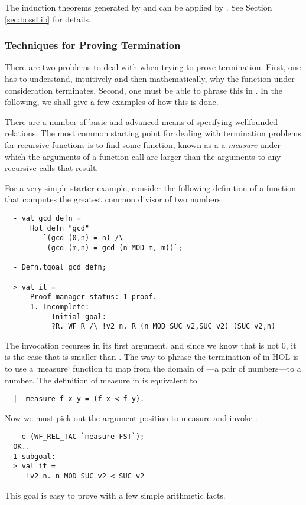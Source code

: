 The induction theorems generated by  and  can 
be applied by . See Section \ref{sec:bossLib} for details.

\subsubsection{Techniques for Proving Termination}

There are two problems to deal with when trying to prove termination.
First, one has to understand, intuitively and then mathematically,
why the function under consideration terminates. Second, one must
be able to phrase this in \HOL. In the following, we shall give a few
examples of how this is done.

There are a number of basic and advanced means of specifying wellfounded
relations. The most common starting point for dealing with termination
problems for recursive functions is to find some function, known as a a
\emph{measure} under which the arguments of a function call are larger
than the arguments to any recursive calls that result.

For a very simple starter example, consider the following definition
of a function that computes the greatest common divisor of two
numbers:
%
\setcounter{sessioncount}{0}
\begin{session}
\begin{hol}
\begin{verbatim}
  - val gcd_defn =
      Hol_defn "gcd"
         `(gcd (0,n) = n) /\
          (gcd (m,n) = gcd (n MOD m, m))`;

  - Defn.tgoal gcd_defn;

  > val it =
      Proof manager status: 1 proof.
      1. Incomplete:
           Initial goal:
           ?R. WF R /\ !v2 n. R (n MOD SUC v2,SUC v2) (SUC v2,n)
\end{verbatim}
\end{hol}
\end{session}
%
The invocation  recurses in its first argument, and
since we know that  is not 0, it is the case that
 is smaller than \holtxt{m}. The way to phrase the
termination of  in HOL is to use a `measure` function
to map from the domain of \holtxt{gcd}---a pair of numbers---to a number.
The definition of {measure} in \HOL{} is equivalent to
%
\begin{hol}
\begin{verbatim}
  |- measure f x y = (f x < f y).
\end{verbatim}
\end{hol}
%
Now we must pick out the argument position to measure and
invoke :
\begin{session}
\begin{hol}
\begin{verbatim}
  - e (WF_REL_TAC `measure FST`);
  OK..
  1 subgoal:
  > val it =
     !v2 n. n MOD SUC v2 < SUC v2
\end{verbatim}
\end{hol}
\end{session}
%
This goal is easy to prove with a few simple arithmetic facts.

